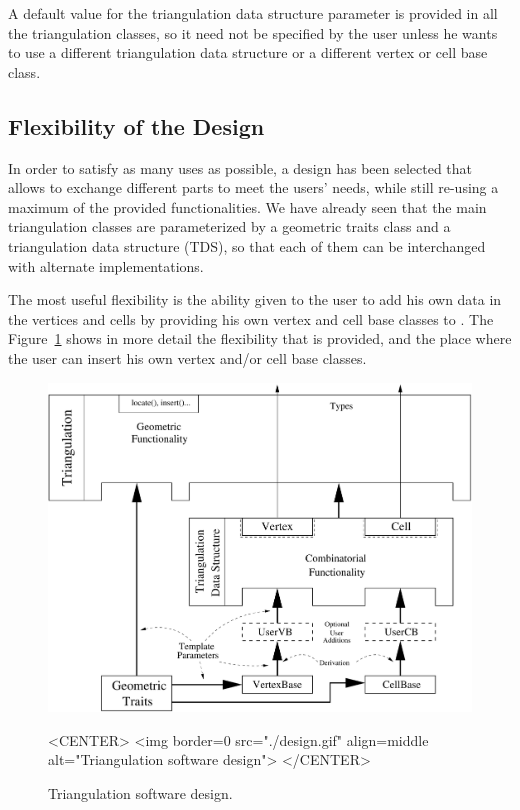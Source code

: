 {A default value for the triangulation data structure parameter is provided in
all the triangulation classes, so it need not be specified by the user unless
he wants to use a different triangulation data structure or a different vertex
or cell base class.

\subsection{Flexibility of the Design}

In order to satisfy as many uses as possible, a design has been selected that
allows to exchange different parts to meet the users' needs, while still
re-using a maximum of the provided functionalities.  We have already seen that
the main triangulation classes are parameterized by a geometric traits class
and a triangulation data structure (TDS), so that each of them can be
interchanged with alternate implementations.

The most useful flexibility is the ability given to the user to add his own
data in the vertices and cells by providing his own vertex and cell base
classes to .  The
Figure~\ref{T3-fig-layers} shows in more detail the flexibility that is
provided, and the place where the user can insert his own vertex and/or cell
base classes.

\begin{figure}[htbp]
\begin{ccTexOnly}
\begin{center}
\includegraphics[width=13cm]{Triangulation_3/design}
\end{center}
\end{ccTexOnly}
\begin{ccHtmlOnly}
<CENTER>
<img border=0 src="./design.gif" align=middle alt="Triangulation software design">
</CENTER>
\end{ccHtmlOnly}
\caption{Triangulation software design.
\label{T3-fig-layers}}
\end{figure}


}
